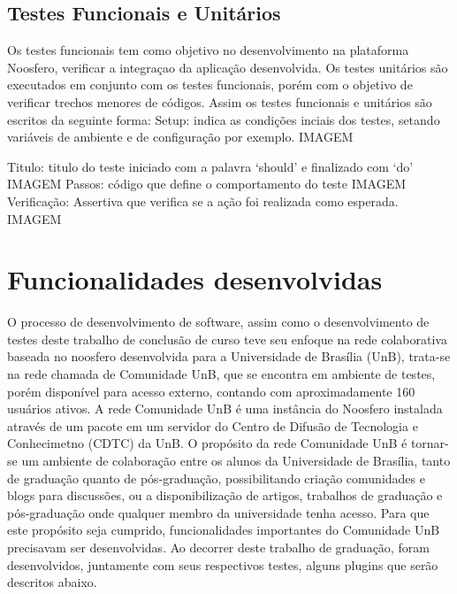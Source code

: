 \subsection{Testes Funcionais e Unitários}
%
Os testes funcionais tem como objetivo no desenvolvimento na plataforma Noosfero, verificar
a integraçao da aplicação desenvolvida.
%
Os testes unitários são executados em conjunto com os testes funcionais, porém  com o objetivo
de verificar trechos menores de códigos.
%
Assim os testes funcionais e unitários são escritos da seguinte forma:
%
Setup: indica as condições inciais dos testes, setando variáveis de ambiente e de 
configuração por exemplo.
IMAGEM

Titulo: titulo do teste iniciado com a palavra ‘should’ e finalizado com ‘do’
IMAGEM
%
Passos: código que define o comportamento do teste
IMAGEM
%
Verificação: Assertiva que verifica se a ação foi realizada como esperada.
IMAGEM
%

\section{Funcionalidades desenvolvidas}
O processo de desenvolvimento de software, assim como o desenvolvimento de testes 
deste trabalho de conclusão de curso teve seu enfoque na rede colaborativa baseada 
no noosfero desenvolvida para a Universidade de Brasília (UnB), trata-se na rede 
chamada de Comunidade UnB, que se encontra em ambiente de testes, porém disponível 
para acesso externo, contando com aproximadamente 160 usuários ativos. A rede 
Comunidade UnB é uma instância do Noosfero instalada através de um pacote em um 
servidor do Centro de Difusão de Tecnologia e Conhecimetno (CDTC) da UnB.
%
O propósito da rede Comunidade UnB é tornar-se um ambiente de colaboração entre os 
alunos da Universidade de Brasília, tanto de graduação quanto de pós-graduação, 
possibilitando criação comunidades e blogs para discussões, ou a disponibilização 
de artigos, trabalhos de graduação e pós-graduação onde qualquer membro da universidade 
tenha acesso.
%
Para que este propósito seja cumprido, funcionalidades importantes do Comunidade 
UnB precisavam ser desenvolvidas. Ao decorrer deste trabalho de graduação, foram 
desenvolvidos, juntamente com seus respectivos testes, alguns plugins que serão 
descritos abaixo.
